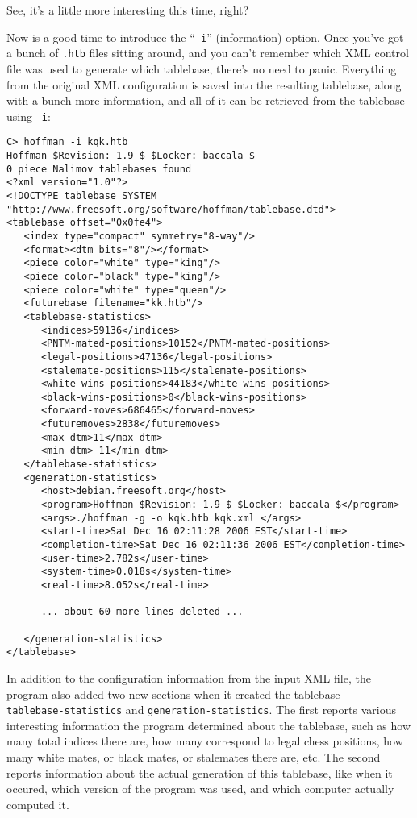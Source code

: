 \documentclass[11pt]{article}
\begin{document}
See, it's a little more interesting this time, right?

Now is a good time to introduce the ``{\tt -i}'' (information) option.
Once you've got a bunch of {\tt .htb} files sitting around, and you
can't remember which XML control file was used to generate which
tablebase, there's no need to panic.  Everything from the original XML
configuration is saved into the resulting tablebase, along with a
bunch more information, and all of it can be retrieved from the
tablebase using {\tt -i}:

{\small\begin{verbatim}
C> hoffman -i kqk.htb
Hoffman $Revision: 1.9 $ $Locker: baccala $
0 piece Nalimov tablebases found
<?xml version="1.0"?>
<!DOCTYPE tablebase SYSTEM "http://www.freesoft.org/software/hoffman/tablebase.dtd">
<tablebase offset="0x0fe4">
   <index type="compact" symmetry="8-way"/>
   <format><dtm bits="8"/></format>
   <piece color="white" type="king"/>
   <piece color="black" type="king"/>
   <piece color="white" type="queen"/>
   <futurebase filename="kk.htb"/>
   <tablebase-statistics>
      <indices>59136</indices>
      <PNTM-mated-positions>10152</PNTM-mated-positions>
      <legal-positions>47136</legal-positions>
      <stalemate-positions>115</stalemate-positions>
      <white-wins-positions>44183</white-wins-positions>
      <black-wins-positions>0</black-wins-positions>
      <forward-moves>686465</forward-moves>
      <futuremoves>2838</futuremoves>
      <max-dtm>11</max-dtm>
      <min-dtm>-11</min-dtm>
   </tablebase-statistics>
   <generation-statistics>
      <host>debian.freesoft.org</host>
      <program>Hoffman $Revision: 1.9 $ $Locker: baccala $</program>
      <args>./hoffman -g -o kqk.htb kqk.xml </args>
      <start-time>Sat Dec 16 02:11:28 2006 EST</start-time>
      <completion-time>Sat Dec 16 02:11:36 2006 EST</completion-time>
      <user-time>2.782s</user-time>
      <system-time>0.018s</system-time>
      <real-time>8.052s</real-time>

      ... about 60 more lines deleted ...

   </generation-statistics>
</tablebase>
\end{verbatim}}

In addition to the configuration information from the input XML file,
the program also added two new sections when it created the tablebase
--- {\tt tablebase-statistics} and {\tt generation-statistics}.  The
first reports various interesting information the program determined
about the tablebase, such as how many total indices there are, how
many correspond to legal chess positions, how many white mates, or
black mates, or stalemates there are, etc.  The second reports
information about the actual generation of this tablebase, like when
it occured, which version of the program was used, and which computer
actually computed it.
\end{document}
